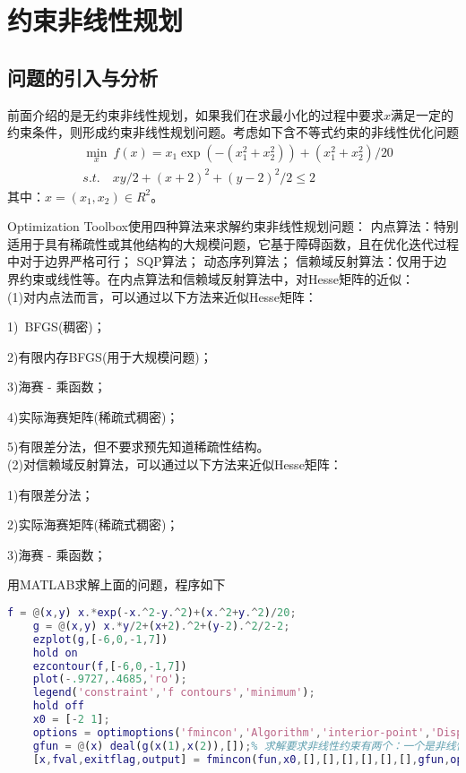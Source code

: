 % 
\chapter{约束非线性规划}
\section{问题的引入与分析}
    \par
    前面介绍的是无约束非线性规划，如果我们在求最小化的过程中要求$x$满足一定的约束条件，则形成约束非线性规划问题。考虑如下含不等式约束的非线性优化问题
    \begin{align*}
    & \mathop {\min}\limits_x\  f(x)=x_1\exp(-(x_1^2+x_2^2))+(x_1^2+x_2^2)/20\\
    & s.t. \quad xy/2+(x+2)^2+(y-2)^2/2 \leqslant 2
    \end{align*}
    其中：$x=(x_1,x_2) \in R^2$。
    \par
    Optimization Toolbox使用四种算法来求解约束非线性规划问题：
    内点算法：特别适用于具有稀疏性或其他结构的大规模问题，它基于障碍函数，且在优化迭代过程中对于边界严格可行；
    SQP算法；
    动态序列算法；
    信赖域反射算法：仅用于边界约束或线性等。在内点算法和信赖域反射算法中，对Hesse矩阵的近似：\\
    (1)对内点法而言，可以通过以下方法来近似Hesse矩阵：\par
    1)\ BFGS(稠密)；\par
    2)有限内存BFGS(用于大规模问题)；\par
    3)海赛 - 乘函数；\par
    4)实际海赛矩阵(稀疏式稠密)；\par
    5)有限差分法，但不要求预先知道稀疏性结构。\\
    (2)对信赖域反射算法，可以通过以下方法来近似Hesse矩阵：\par
    1)有限差分法；\par
    2)实际海赛矩阵(稀疏式稠密)；\par
    3)海赛 - 乘函数；\par
    用MATLAB求解上面的问题，程序如下
    \begin{lstlisting}[language=Matlab]
    f = @(x,y) x.*exp(-x.^2-y.^2)+(x.^2+y.^2)/20;
    g = @(x,y) x.*y/2+(x+2).^2+(y-2).^2/2-2;
    ezplot(g,[-6,0,-1,7])
    hold on
    ezcontour(f,[-6,0,-1,7])
    plot(-.9727,.4685,'ro');
    legend('constraint','f contours','minimum');
    hold off
    x0 = [-2 1];
    options = optimoptions('fmincon','Algorithm','interior-point','Display','iter');% 求解器fmincon使用内点算法（interior-point aligorithm），并打开每一次迭代的结果。
    gfun = @(x) deal(g(x(1),x(2)),[]);% 求解要求非线性约束有两个：一个是非线性不等式，另一个是非线性等式。我们用deal函数写这个约束。
    [x,fval,exitflag,output] = fmincon(fun,x0,[],[],[],[],[],[],gfun,options);
    \end{lstlisting}
